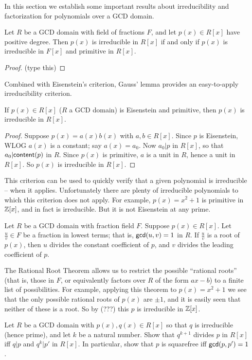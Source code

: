 In this section we establish some important results about irreducibility and factorization for polynomials over a GCD domain.

\begin{prop}
Let \(R\) be a GCD domain with field of fractions \(F\), and let \(p(x) \in R[x]\) have positive degree.
Then \(p(x)\) is irreducible in \(R[x]\) if and only if \(p(x)\) is irreducible in \(F[x]\) and primitive in \(R[x]\).
\end{prop}

\begin{proof}
(type this)
\end{proof}

Combined with Eisenstein's criterion, Gauss' lemma provides an easy-to-apply irreducibility criterion.

\begin{cor}
If \(p(x) \in R[x]\) (\(R\) a GCD domain) is Eisenstein and primitive, then \(p(x)\) is irreducible in \(R[x]\).
\end{cor}

\begin{proof}
Suppose \(p(x) = a(x)b(x)\) with \(a,b \in R[x]\).
Since \(p\) is Eisenstein, WLOG \(a(x)\) is a constant; say \(a(x) = a_0\).
Now \(a_0|p\) in \(R[x]\), so that \(a_0|\mathsf{content}(p)\) in \(R\).
Since \(p(x)\) is primitive, \(a\) is a unit in \(R\), hence a unit in \(R[x]\).
So \(p(x)\) is irreducible in \(R[x]\).
\end{proof}

This criterion can be used to quickly verify that a given polynomial is irreducible -- when it applies.
Unfortunately there are plenty of irreducible polynomials to which this criterion does not apply.
For example, \(p(x) = x^2 + 1\) is primitive in \(\mathbb{Z}[x]\), and in fact is irreducible.
But it is not Eisenstein at any prime.

\begin{prop}
Let \(R\) be a GCD domain with fraction field \(F\).
Suppose \(p(x) \in R[x]\).
Let \(\frac{u}{v} \in F\) be a fraction in lowest terms; that is, \(\mathsf{gcd}(u, v) = 1\) in \(R\).
If \(\frac{u}{v}\) is a root of \(p(x)\), then \(u\) divides the constant coefficient of \(p\), and \(v\) divides the leading coefficient of \(p\).
\end{prop}

The Rational Root Theorem allows us to restrict the possible ``rational roots'' (that is, those in \(F\), or equivalently factors over \(R\) of the form \(ax-b\)) to a finite list of possibilities.
For example, applying this theorem to \(p(x) = x^2 + 1\) we see that the only possible rational roots of \(p(x)\) are \(\pm 1\), and it is easily seen that neither of these is a root.
So by (???) this \(p\) is irreducible in \(\mathbb{Z}[x]\).

\Exercises%

\begin{exercise}
Let \(R\) be a GCD domain with \(p(x), q(x) \in R[x]\) so that \(q\) is irreducible (hence prime), and let \(k\) be a natural number.
Show that \(q^{k+1}\) divides \(p\) in \(R[x]\) iff \(q|p\) and \(q^k|p'\) in \(R[x]\).
In particular, show that \(p\) is squarefree iff \(\mathsf{gcd}(p, p') = 1\).
\end{exercise}
